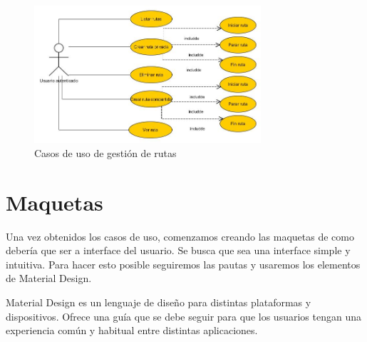 \begin{figure}[H]
		\centering
		\includegraphics[width=0.75\textwidth] {rutas.jpg}
		\caption{Casos de uso de gestión de rutas }
	\end{figure}

\newpage
\section{Maquetas}
Una vez obtenidos los casos de uso, comenzamos creando las maquetas de como debería que ser a interface del usuario.
Se busca que sea una interface simple y intuitiva.
Para hacer esto posible seguiremos las pautas y usaremos los elementos de Material Design. 


Material Design es un lenguaje de diseño para distintas plataformas y dispositivos. Ofrece una guía que se debe seguir para que los usuarios  tengan una experiencia común y habitual entre distintas aplicaciones.


	
	

